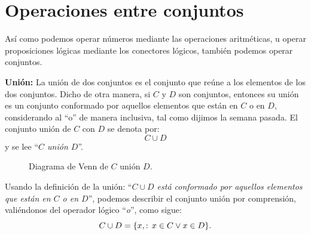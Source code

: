 %	


\section{Operaciones entre conjuntos}

Así como podemos operar números mediante las operaciones aritméticas, 
u operar proposiciones lógicas mediante los conectores lógicos, 
también podemos operar conjuntos.

\textbf{Unión:} La unión de dos conjuntos es el conjunto que 
reúne a los elementos de los dos conjuntos. 
Dicho de otra manera, si $C$ y $D$ son conjuntos, 
entonces su unión es un conjunto conformado por aquellos elementos 
que están en $C$ o en $D$, 
considerando al ``o'' de manera inclusiva, tal como 
dijimos la semana pasada.
El conjunto unión de $C$ con $D$ se denota por:
$$C\cup  D$$ y se lee ``{\em $C$ unión $D$}''.

\begin{center}
	\begin{figure}[h!]
		\begin{center}
		\end{center}
		\caption{Diagrama de Venn de  $C$ unión $D$.}
	\end{figure}
\end{center}

Usando la definición de la unión: 
``{\em $C\cup D$ está conformado por aquellos elementos que 
	están en $C$ o en $D$}'', podemos describir el conjunto 
unión por comprensi\'on, valiéndonos del 
operador lógico ``{\em o}'', como sigue:
$$ C\cup  D=\{ x\\,:\, x\in C\vee x\in D\}.$$

